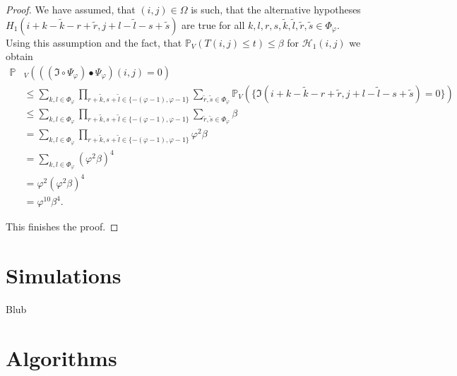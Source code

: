 \documentclass[a4paper,12pt]{article}
\theoremstyle{plain}
\theoremstyle{definition}
\begin{document}
\begin{appendix}
\begin{proof}
		We have assumed, that $(i, j) \in \Omega$ is such, that the alternative hypotheses $H_1(i + k - \tilde{k} - r + \tilde{r}, j + l - \tilde{l} - s + \tilde{s})$ are true for all $k, l, r, s, \tilde{k}, \tilde{l}, \tilde{r}, \tilde{s} \in \Phi_\varphi$. Using this assumption and the fact, that $\mathbb{P}_V\left( T(i, j) \leq t \right) \leq \beta$ for $\mathcal{H}_1(i, j)$ we obtain
		\begin{align*}
			\mathbb{P}&_V\left( ((\mathfrak{I} \circ \Psi_\varphi) \bullet \Psi_\varphi)(i, j) = 0 \right) \\
			&\leq \sum_{k, l \in \Phi_\varphi} \prod_{r + \tilde{k}, s + \tilde{l} \in \{ - ( \varphi - 1 ), \varphi - 1 \}} \sum_{\tilde{r}, \tilde{s} \in \Phi_\varphi} \mathbb{P}_V\left( \{ \mathfrak{I}(i + k - \tilde{k} - r + \tilde{r}, j + l - \tilde{l} - s + \tilde{s}) = 0 \} \right) \\
			&\leq \sum_{k, l \in \Phi_\varphi} \prod_{r + \tilde{k}, s + \tilde{l} \in \{ - ( \varphi - 1 ), \varphi - 1 \}} \sum_{\tilde{r}, \tilde{s} \in \Phi_\varphi} \beta \\
			&= \sum_{k, l \in \Phi_\varphi} \prod_{r + \tilde{k}, s + \tilde{l} \in \{ - ( \varphi - 1 ), \varphi - 1 \}} \varphi^2 \beta \\
			&= \sum_{k, l \in \Phi_\varphi} ( \varphi^2 \beta )^4 \\
			&= \varphi^2 ( \varphi^2 \beta )^4 \\
			&= \varphi^{10} \beta^4.
		\end{align*}
		
		This finishes the proof.
	\end{proof}
	
	\newpage
	
	\section{Simulations}
	
	Blub
	
	\newpage
	
	\section{Algorithms}
	
	
	
	\newpage
	
	
	

\end{appendix}
\end{document}
